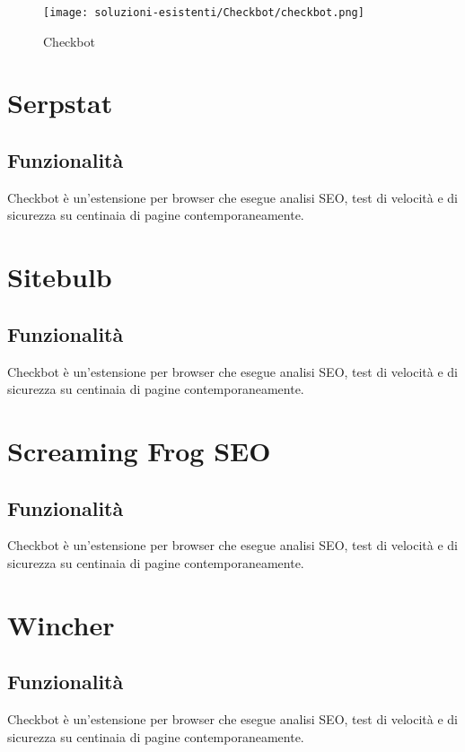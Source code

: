\begin{figure}[H]
    \centering 
    \texttt{[image: soluzioni-esistenti/Checkbot/checkbot.png]} 
    \caption{Checkbot}
\end{figure}

\section{Serpstat}

\subsection{Funzionalità}
\par Checkbot è un'estensione per browser che esegue analisi SEO, test di velocità e di sicurezza su centinaia di pagine contemporaneamente.

\section{Sitebulb}

\subsection{Funzionalità}
\par Checkbot è un'estensione per browser che esegue analisi SEO, test di velocità e di sicurezza su centinaia di pagine contemporaneamente.

\section{Screaming Frog SEO}

\subsection{Funzionalità}
\par Checkbot è un'estensione per browser che esegue analisi SEO, test di velocità e di sicurezza su centinaia di pagine contemporaneamente.

\section{Wincher}

\subsection{Funzionalità}
\par Checkbot è un'estensione per browser che esegue analisi SEO, test di velocità e di sicurezza su centinaia di pagine contemporaneamente.

